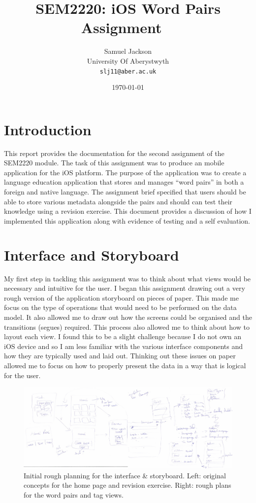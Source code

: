 \documentclass[paper=a4, fontsize=11pt]{scrartcl}	%
\title{
	\vspace{-0.5in} 	\usefont{OT1}{bch}{b}{n}
        SEM2220: iOS Word Pairs Assignment \
}
\author{
	\usefont{OT1}{bch}{m}{n} Samuel Jackson
	\\ \usefont{OT1}{bch}{m}{n} University Of Aberystwyth
	\\   \texttt{slj11@aber.ac.uk}
}
\date{\today}
\numberwithin{equation}{section}															%
\numberwithin{figure}{section}																%
\numberwithin{table}{section}
\begin{document}
\maketitle

\clearpage

\section{Introduction}
This report provides the documentation for the second assignment of the SEM2220 module. The task of this assignment was to produce an mobile application for the iOS platform. The purpose of the application was to create a language education application that stores and manages ``word pairs'' in both a foreign and native language. The assignment brief specified that users should be able to store various metadata alongside the pairs and should can test their knowledge using a revision exercise. This document provides a discussion of how I implemented this application along with evidence of testing and a self evaluation. 

\section{Interface and Storyboard}
My first step in tackling this assignment was to think about what views would be necessary and intuitive for the user. I began this assignment drawing out a very rough version of the application storyboard on pieces of paper. This made me focus on the type of operations that would need to be performed on the data model. It also allowed me to draw out how the screens could be organised and the transitions (segues) required. This process also allowed me to think about how to layout each view. I found this to be a slight challenge because I do not own an iOS device and so I am less familiar with the various interface components and how they are typically used and laid out. Thinking out these issues on paper allowed me to focus on how to properly present the data in a way that is logical for the user.

\begin{figure}[H]
\centering
\includegraphics[width=1.0\textwidth]{img/planning.jpg}
\caption{Initial rough planning for the interface \& storyboard. Left: original concepts for the home page and revision exercise. Right: rough plans for the word pairs and tag views.}
\label{fig:planning}
\end{figure}
\end{document}
